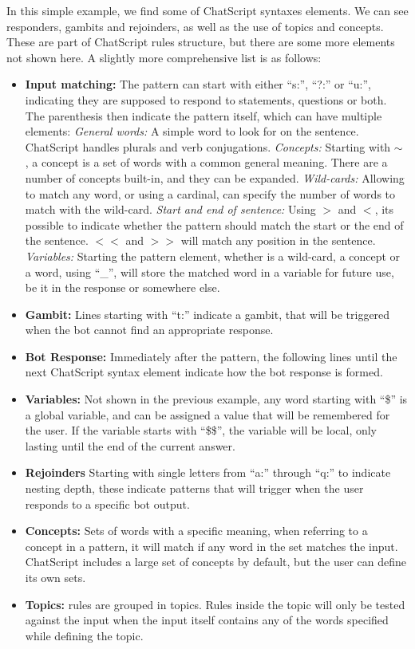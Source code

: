 In this simple example, we find some of ChatScript syntaxes elements. We can see responders, gambits and rejoinders, as well as the use of topics and concepts. These are part of ChatScript rules structure, but there are some more elements not shown here. A slightly more comprehensive list is as follows:
\begin{itemize}
 \item \textbf{Input matching:} The pattern can start with either ``s:'', ``?:'' or ``u:'', indicating they are supposed to respond to statements, questions or both. The parenthesis then indicate the pattern itself, which can have multiple elements:
    \subitem \emph{General words:} A simple word to look for on the sentence. ChatScript handles plurals and verb conjugations.
    \subitem \emph{Concepts:} Starting with $\sim$ , a concept is a set of words with a common general meaning. There are a number of concepts built-in, and they can be expanded.
    \subitem \emph{Wild-cards:} Allowing to match any word, or using a cardinal, can specify the number of words to match with the wild-card.
    \subitem \emph{Start and end of sentence:} Using $>$ and $<$, its possible to indicate whether the pattern should match the start or the end of the sentence. $<<$ and $>>$ will match any position in the sentence.
    \subitem \emph{Variables: } Starting the pattern element, whether is a wild-card, a concept or a word, using ``\_'', will store the matched word in a variable for future use, be it in the response or somewhere else.
  \item \textbf{Gambit:} Lines starting with ``t:'' indicate a gambit, that will be triggered when the bot cannot find an appropriate response.
  \item \textbf{Bot Response:} Immediately after the pattern, the following lines until the next ChatScript syntax element indicate how the bot response is formed.
  \item \textbf{Variables:} Not shown in the previous example, any word starting with ``\$'' is a global variable, and can be assigned a value that will be remembered for the user. If the variable starts with ``\$\$'', the variable will be local, only lasting until the end of the current answer.
  \item \textbf{Rejoinders} Starting with single letters from ``a:'' through ``q:'' to indicate nesting depth, these indicate patterns that will trigger when the user responds to a specific bot output.
  \item \textbf{Concepts:} Sets of words with a specific meaning, when referring to a concept in a pattern, it will match if any word in the set matches the input. ChatScript includes a large set of concepts by default, but the user can define its own sets.
  \item \textbf{Topics:} rules are grouped in topics. Rules inside the topic will only be tested against the input when the input itself contains any of the words specified while defining the topic.
\end{itemize}

